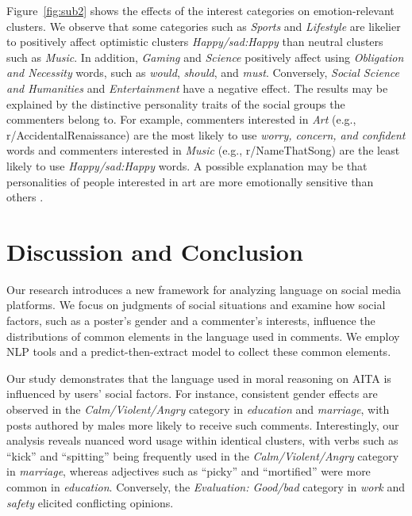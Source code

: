 \documentclass[letterpaper]{article} %
\newcommand{\fqt}[1]{``#1''}
\begin{document}
Figure~\ref{fig:sub2} shows the effects of the interest categories on emotion-relevant clusters.
We observe that some categories such as \textsl{Sports} and \textsl{Lifestyle} are likelier to positively affect optimistic clusters \textsl{Happy/sad:Happy} than neutral clusters such as \textsl{Music}.
In addition, \textsl{Gaming} and \textsl{Science} positively affect using \textsl{Obligation and Necessity} words, such as \textsl{would}, \textsl{should}, and \textsl{must}.
Conversely, \textsl{Social Science and Humanities} and \textsl{Entertainment} have a negative effect.
The results may be explained by the distinctive personality traits of the social groups the commenters belong to.
For example, commenters interested in \textsl{Art} (e.g., r/AccidentalRenaissance) are the most likely to use \textsl{worry, concern, and confident} words and commenters interested in \textsl{Music} (e.g., r/NameThatSong) are the least likely to use  \textsl{Happy/sad:Happy} words.
A possible explanation may be that personalities of people interested in art are more emotionally sensitive than others \cite{csik-1973-personality}.

\section{Discussion and Conclusion}

Our research introduces a new framework for analyzing language on social media platforms. 
We focus on judgments of social situations and examine how social factors, such as a poster's gender and a commenter's interests, influence the distributions of common elements in the language used in comments. 
We employ NLP tools and a predict-then-extract model to collect these common elements.

Our study demonstrates that the language used in moral reasoning on AITA is influenced by users' social factors. 
For instance, consistent gender effects are observed in the \textsl{Calm/Violent/Angry} category in \textsl{education} and \textsl{marriage}, with posts authored by males more likely to receive such comments. Interestingly, our analysis reveals nuanced word usage within identical clusters, with verbs such as \fqt{kick} and \fqt{spitting} being frequently used in the \textsl{Calm/Violent/Angry} category in \textsl{marriage}, whereas adjectives such as \fqt{picky} and \fqt{mortified} were more common in \textsl{education}. 
Conversely, the \textsl{Evaluation: Good/bad} category in \textsl{work} and \textsl{safety} elicited conflicting opinions.
\end{document}
